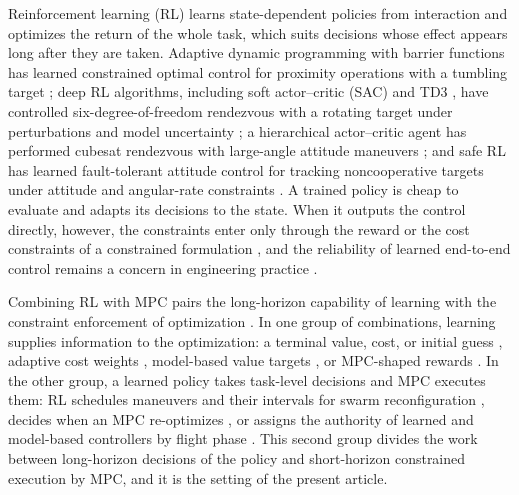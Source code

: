 Reinforcement learning (RL) learns state-dependent policies from interaction and optimizes the return of the whole task, which suits decisions whose effect appears long after they are taken. Adaptive dynamic programming with barrier functions has learned constrained optimal control for proximity operations with a tumbling target \cite{tian2024taes}; deep RL algorithms, including soft actor--critic (SAC) \cite{haarnoja2018sac} and TD3 \cite{fujimoto2018td3}, have controlled six-degree-of-freedom rendezvous with a rotating target under perturbations and model uncertainty \cite{yang2025taes}; a hierarchical actor--critic agent has performed cubesat rendezvous with large-angle attitude maneuvers \cite{tammam2025cep}; and safe RL has learned fault-tolerant attitude control for tracking noncooperative targets under attitude and angular-rate constraints \cite{lu2026ast}. A trained policy is cheap to evaluate and adapts its decisions to the state. When it outputs the control directly, however, the constraints enter only through the reward \cite{yang2025taes} or the cost constraints of a constrained formulation \cite{lu2026ast}, and the reliability of learned end-to-end control remains a concern in engineering practice \cite{ren2026taes}.

Combining RL with MPC pairs the long-horizon capability of learning with the constraint enforcement of optimization \cite{reiter2026arc}. In one group of combinations, learning supplies information to the optimization: a terminal value, cost, or initial guess \cite{reiter2025ac4mpc,ghezzi2026ecc}, adaptive cost weights \cite{gong2026ast}, model-based value targets \cite{wu2024mpcvalue}, or MPC-shaped rewards \cite{ramezani2026aa}. In the other group, a learned policy takes task-level decisions and MPC executes them: RL schedules maneuvers and their intervals for swarm reconfiguration \cite{ren2026taes}, decides when an MPC re-optimizes \cite{zheng2026aa}, or assigns the authority of learned and model-based controllers by flight phase \cite{adjei2026ast}. This second group divides the work between long-horizon decisions of the policy and short-horizon constrained execution by MPC, and it is the setting of the present article.

